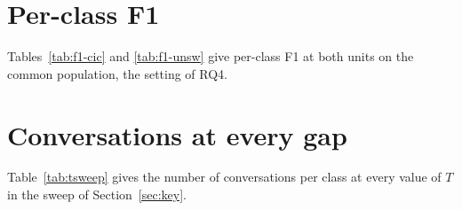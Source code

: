 

\section{Per-class F1}\label{app:f1}

Tables~\ref{tab:f1-cic} and \ref{tab:f1-unsw} give per-class F1 at both units on the common population, the setting of RQ4.




\section{Conversations at every gap}\label{app:tsweep}

Table~\ref{tab:tsweep} gives the number of conversations per class at every value of $T$ in the sweep of Section~\ref{sec:key}.



